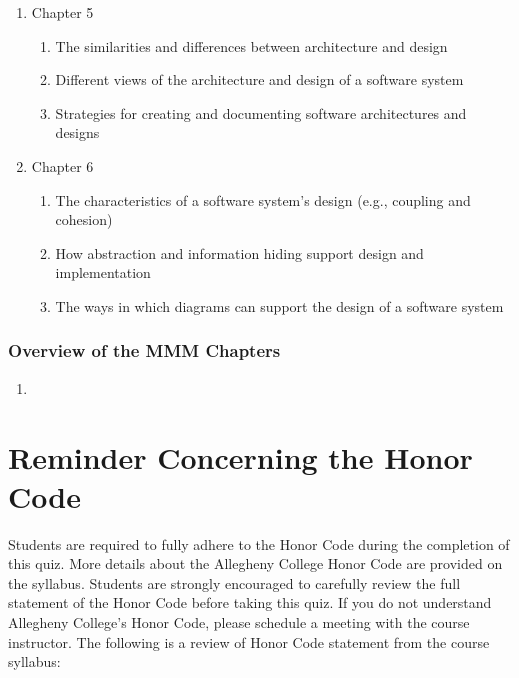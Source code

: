 \documentclass[11pt]{article}
\begin{document}
\begin{enumerate}
  \item Chapter 5

    \begin{enumerate}
      \itemsep 0in
      \item The similarities and differences between architecture and design
      \item Different views of the architecture and design of a software system
      \item Strategies for creating and documenting software architectures and designs
    \end{enumerate}

  \item Chapter 6

    \begin{enumerate}
      \itemsep 0in
      \item The characteristics of a software system's design (e.g., coupling
        and cohesion)
      \item How abstraction and information hiding support design and
        implementation
      \item The ways in which diagrams can support the design of a software
        system
    \end{enumerate}

\end{enumerate}

\vspace*{-1em}

\subsubsection*{Overview of the MMM Chapters}

\begin{enumerate}
  \item 
\end{enumerate}

\section*{Reminder Concerning the Honor Code}

\noindent Students are required to fully adhere to the Honor Code during the
completion of this quiz. More details about the Allegheny College Honor Code are
provided on the syllabus. Students are strongly encouraged to carefully review
the full statement of the Honor Code before taking this quiz. If you do not
understand Allegheny College's Honor Code, please schedule a meeting with the
course instructor. The following is a review of Honor Code statement from the
course syllabus:
\end{document}
